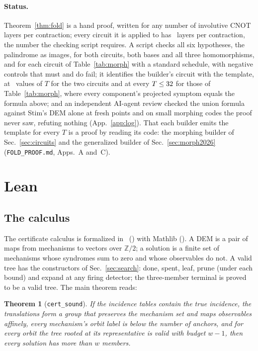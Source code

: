 \documentclass[aps,pra,twocolumn,superscriptaddress,nofootinbib,longbibliography,floatfix]{revtex4-2}
\newtheorem{theorem}{Theorem}
\begin{document}
\paragraph*{Status.} Theorem~\ref{thm:fold} is a hand proof, written for any number of involutive CNOT layers per contraction; every circuit it is applied to has \MorphLayers\ layers per contraction, the number the checking script requires. A script checks all six hypotheses, the palindrome as images, for both circuits, both bases and all three homomorphisms, and for each circuit of Table~\ref{tab:morph} with a standard schedule, with negative controls that must and do fail; it identifies the builder's circuit with the template, at \FoldTplCount\ values of $T$ for the two circuits and at every $T\le32$ for those of Table~\ref{tab:morph}, where every component's projected symptom equals the formula above; and an independent AI-agent review checked the union formula against Stim's DEM alone at fresh points and on small morphing codes the proof never saw, refuting nothing (App.~\ref{app:log}). That each builder emits the template for every $T$ is a proof by reading its code: the morphing builder of Sec.~\ref{sec:circuits} and the generalized builder of Sec.~\ref{sec:morph2026} (\texttt{FOLD\_PROOF.md}, Apps.~A and~C).

\section{Lean}
\label{sec:lean}

\subsection{The calculus}

The certificate calculus is formalized in \LeanName\ (\LeanVersion) with Mathlib (\MathlibVersion). A DEM is a pair of maps from mechanisms to vectors over $\mathbb Z/2$; a solution is a finite set of mechanisms whose syndromes sum to zero and whose observables do not. A valid tree has the constructors of Sec.~\ref{sec:search}: done, spent, leaf, prune (under each bound) and expand at any firing detector; the three-member terminal is proved to be a valid tree. The main theorem reads:

\begin{theorem}[\texttt{cert\_sound}]
If the incidence tables contain the true incidence, the translations form a group that preserves the mechanism set and maps observables affinely, every mechanism's orbit label is below the number of anchors, and for every orbit the tree rooted at its representative is valid with budget $w-1$, then every solution has more than $w$ members.
\end{theorem}
\end{document}
